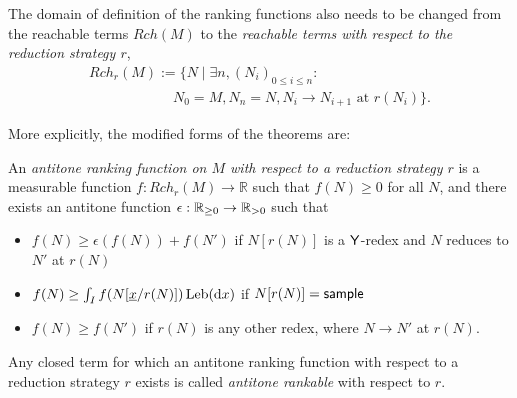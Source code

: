 The domain of definition of the ranking functions also needs to be changed from the reachable terms $\mathit{Rch}(M)$ to the \emph{reachable terms with respect to the reduction strategy $r$},
\[
\begin{array}{l}
\mathit{Rch}_r(M) := \{N \mid \exists n, (N_i)_{0 \leq i \leq n} : {}\\
\qquad\qquad\qquad N_0 = M, N_n = N, N_i \to N_{i+1} \text{ at } r(N_i)\}.
\end{array}
\]

More explicitly, the modified forms of the theorems are:
\begin{definition}
An \emph{antitone ranking function on $M$ with respect to a reduction strategy $r$} is a measurable function $f:\mathit{Rch}_r(M) \to \mathbb{R}$ such that $f(N) \geq 0$ for all $N$, and there exists an antitone function $\epsilon : \mathbb{R}_{{\geq}0} \to \mathbb{R}_{{>}0}$ such that
\begin{itemize}
    \item $f(N) \geq \epsilon(f(N)) + f(N')$ if $N[r(N)]$ is a $\mathsf{Y}$-redex and $N$ reduces to $N'$ at $r(N)$
    \item $f(N) \geq \int_I f(N[\underline{x}/r(N)]) \, \mathrm{Leb}(\mathrm{d}x)$ if $N[r(N)] = \mathsf{sample}$

    \item $f(N) \geq f(N')$ if $r(N)$ is any other redex, where $N \to N'$ at $r(N)$.
\end{itemize}
Any closed term for which an antitone ranking function with respect to a reduction strategy $r$ exists is called \emph{antitone rankable} with respect to $r$. 
\end{definition}

